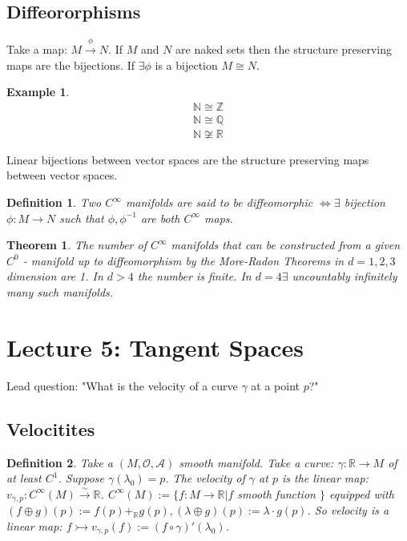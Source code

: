 \documentclass[10pt, oneside]{article}
\newcommand{\R}{\mathbb{R}}
\newcommand{\Z}{\mathbb{Z}}
\newcommand{\N}{\mathbb{N}}
\newcommand{\Q}{\mathbb{Q}}
\newtheorem{thm}{Theorem}
\newtheorem{defn}{Definition}
\newtheorem{example}{Example}
\begin{document}
  \subsection{Diffeororphisms}
     Take a map: $M \xrightarrow{\phi} N$. If $M$ and $N$ are naked sets then the structure preserving maps are the bijections. If $\exists \phi$ is a bijection $M \cong N$.
     \begin{example}
     \begin{align*}
        \N \cong \Z \\
        \N \cong \Q \\
        \N \not \cong \R
     \end{align*}
     \end{example}
     Linear bijections between vector spaces are the structure preserving maps between vector spaces.
     \begin{defn}
        Two $C^\infty$ manifolds are said to be diffeomorphic $\iff \exists$ bijection $\phi: M \to N$ such that $\phi, \phi^{-1}$ are both $C^\infty$ maps.
     \end{defn}
     \begin{thm}
        The number of $C^\infty$ manifolds that can be constructed from a given $C^0$ - manifold up to diffeomorphism by the More-Radon Theorems in $d = 1,2,3$ dimension are 1. In $d > 4$ the number is finite. In $d=4 \exists$ uncountably infinitely many such manifolds.
     \end{thm}
\section{Lecture 5: Tangent Spaces \cite{Tangent}}
     Lead question: "What is the velocity of a curve $\gamma$ at a point $p$?"
  \subsection{Velocitites}
     \begin{defn}
        Take a $(M,\mathcal{O}, \mathcal{A})$ smooth manifold. Take a curve: $\gamma: \R \to M$ of at least $C^1$. Suppose $\gamma(\lambda_0) = p$.
        The velocity of $\gamma$ at $p$ is the linear map: $v_{\gamma,p}: C^{\infty}(M) \xrightarrow{\sim} \R$. $C^\infty (M) := \{f:M \to \R | f $ smooth function $\}$ equipped with $(f \oplus g)(p) := f(p) +_{\R} g(p), (\lambda \oplus g)(p):=\lambda \cdot g(p)$.
        So velocity is a linear map: $f \rightarrowtail v_{\gamma,p} (f) := (f \circ \gamma)'(\lambda_0)$.
     \end{defn}
\end{document}
